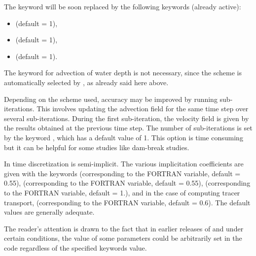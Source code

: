 The keyword  will be soon replaced
by the following keywords (already active):
\begin{itemize}
\item {} (default = 1),
\item {} (default = 1),
\item {} (default = 1).
\end{itemize}
The keyword for advection of water depth is not necessary, since the scheme is
automatically selected by , as already said here above.

Depending on the scheme used, accuracy may be improved by running sub-iterations.
This involves updating the advection field for the same time step over several
sub-iterations.
During the first sub-iteration, the velocity field is given by the results
obtained at the previous time step.
The number of sub-iterations is set by the keyword
,
which has a default value of 1.
This option is time consuming but it can be helpful for some studies
like dam-break studies.

In  time discretization is semi-implicit.
The various implicitation coefficients are given with the keywords
(corresponding to the  FORTRAN variable, default = 0.55),
(corresponding to the  FORTRAN variable, default = 0.55),
(corresponding to the  FORTRAN variable, default = 1.),
and in the case of computing tracer transport,
(corresponding to the  FORTRAN variable, default = 0.6).
The default values are generally adequate.

The reader's attention is drawn to the fact that in earlier releases of
 and under certain conditions,
the value of some parameters could be arbitrarily set in the code regardless
of the specified keywords value.
%
%
%


